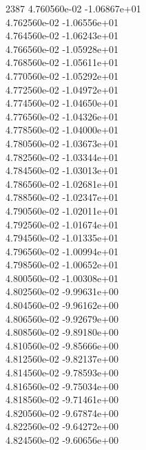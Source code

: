2387	4.760560e-02	-1.06867e+01	\\ 	4.762560e-02	-1.06556e+01	\\ 	4.764560e-02	-1.06243e+01	\\ 	4.766560e-02	-1.05928e+01	\\ 	4.768560e-02	-1.05611e+01	\\ 	4.770560e-02	-1.05292e+01	\\ 	4.772560e-02	-1.04972e+01	\\ 	4.774560e-02	-1.04650e+01	\\ 	4.776560e-02	-1.04326e+01	\\ 	4.778560e-02	-1.04000e+01	\\ 	4.780560e-02	-1.03673e+01	\\ 	4.782560e-02	-1.03344e+01	\\ 	4.784560e-02	-1.03013e+01	\\ 	4.786560e-02	-1.02681e+01	\\ 	4.788560e-02	-1.02347e+01	\\ 	4.790560e-02	-1.02011e+01	\\ 	4.792560e-02	-1.01674e+01	\\ 	4.794560e-02	-1.01335e+01	\\ 	4.796560e-02	-1.00994e+01	\\ 	4.798560e-02	-1.00652e+01	\\ 	4.800560e-02	-1.00308e+01	\\ 	4.802560e-02	-9.99631e+00	\\ 	4.804560e-02	-9.96162e+00	\\ 	4.806560e-02	-9.92679e+00	\\ 	4.808560e-02	-9.89180e+00	\\ 	4.810560e-02	-9.85666e+00	\\ 	4.812560e-02	-9.82137e+00	\\ 	4.814560e-02	-9.78593e+00	\\ 	4.816560e-02	-9.75034e+00	\\ 	4.818560e-02	-9.71461e+00	\\ 	4.820560e-02	-9.67874e+00	\\ 	4.822560e-02	-9.64272e+00	\\ 	4.824560e-02	-9.60656e+00	\\ \hline
